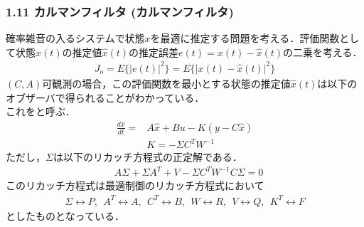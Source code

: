 \begin{frame}[t]
\frametitle{1.11 カルマンフィルタ (カルマンフィルタ)}
確率雑音の入るシステムで状態$x$を最適に推定する問題を考える．評価関数として状態$x(t)$の推定値$\hat{x}(t)$の推定誤差$e(t) = x(t) - \hat{x}(t)$の二乗を考える．
\begin{align}
     J_o = E\{ \vert e(t) \vert^2 \} = E\{ \vert x(t) - \hat{x}(t) \vert^2 \}
\end{align}
$(C,A)$可観測の場合，この評価関数を最小とする状態の推定値$\hat{x}(t)$は以下のオブザーバで得られることがわかっている．\\
これをと呼ぶ．
\begin{align}
 \frac{d \hat{x}}{dt} =& A \hat{x} + B u - K (y - C \hat{x})
\\
 & K = -\Sigma C^T W^{-1}
\end{align}
ただし，$\Sigma$は以下のリカッチ方程式の正定解である．
\begin{align}
 & A \Sigma + \Sigma A^T +  V - \Sigma C^T W^{-1} C \Sigma = 0
\label{riccati_kalman}
\end{align}
このリカッチ方程式は最適制御のリカッチ方程式において
\begin{align}
   \Sigma \leftrightarrow P,   \ \
   A^T    \leftrightarrow A, \ \
   C^T    \leftrightarrow B, \ \
   W      \leftrightarrow R, \ \
   V      \leftrightarrow Q, \ \
   K^T    \leftrightarrow F
\end{align}
としたものとなっている．
\end{frame}


